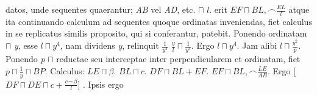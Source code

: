                                     datos, unde sequentes quaerantur;   \textit{AB} vel \textit{AD}, etc. $\sqcap \hspace{4pt}l$. erit $\displaystyle EF \sqcap BL,\smallfrown\frac{EL}{l}$ atque ita continuando calculum ad sequentes quoque ordinatas inveniendas, fiet calculus in se replicatus similis proposito, qui si conferantur, patebit. Ponendo ordinatam $\sqcap$ \textit{y}, esse $l \sqcap y^4$, nam dividens \textit{y}, relinquit $\displaystyle\frac{1}{y^3}$  $\displaystyle \frac{y}{l}\sqcap \frac{1}{y^3}$. Ergo  $l \sqcap y^4$. Jam alibi $\displaystyle l \sqcap \frac{y^2}{p}$. Ponendo \textit{p} $\sqcap$ reductae seu interceptae inter perpendicularem et ordinatam, fiet $\displaystyle p\sqcap \frac{1}{y}\sqcap BP$. Calculus: $\displaystyle LE \sqcap\beta$. $BL\sqcap c$.  $DF \sqcap BL+EF$. $\displaystyle EF \sqcap BL, \smallfrown \frac{LE}{AB}$. Ergo [$\displaystyle DF \sqcap DE \sqcap c + \frac{c \smallfrown\beta}{l}$] \edtext{. Et [$\displaystyle KI \sqcap c + \frac{c\beta}{l}+\frac{c+\displaystyle\frac{c\beta}{l}}{(l)}$]\edtext{}{\lemma{$\displaystyle GI \sqcap c + \frac{c\beta}{l}+\frac{c+\displaystyle\frac{c\beta}{l}}{(l)}$]}\Afootnote{ \textit{\ L \"{a}ndert Hrsg.}}}}{\lemma{$\displaystyle \frac{c \smallfrown\beta}{l}$]}\Afootnote{ \textit{ (1) }\ et $\displaystyle GI \sqcap c + \frac{c\beta}{l}+ \frac{c\beta}{c+\displaystyle\frac{c\beta}{l}}$ \textit{ (2) }\ . Et [$\displaystyle KI \sqcap c + \frac{c\beta}{l}+\frac{c+\displaystyle\frac{c\beta}{l}}{(l)}$] \textit{ L}}}. Ipsis ergo 

